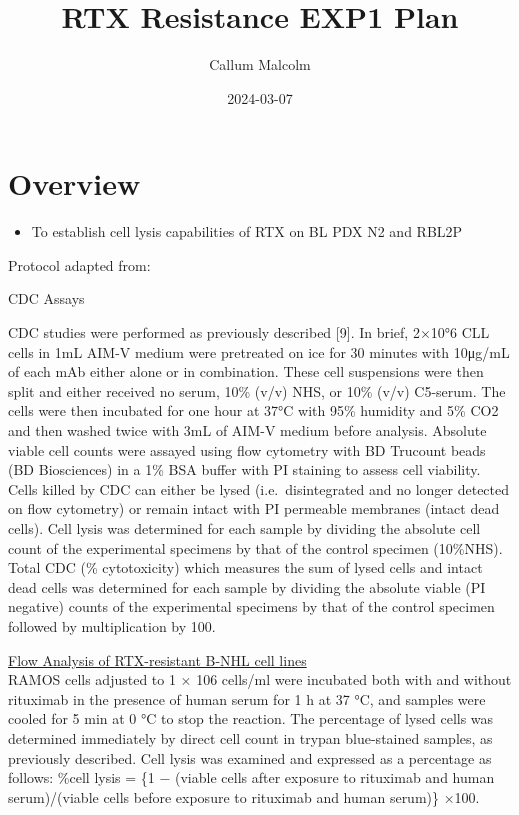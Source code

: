 \documentclass[
]{article}
\title{RTX Resistance EXP1 Plan}
\author{Callum Malcolm}
\date{2024-03-07}
\providecommand{\tightlist}{%
  \setlength{\itemsep}{0pt}\setlength{\parskip}{0pt}}
\begin{document}
\maketitle

\hypertarget{overview}{%
\section{Overview}\label{overview}}

\begin{itemize}
\tightlist
\item
  To establish cell lysis capabilities of RTX on BL PDX N2 and RBL2P
\end{itemize}

Protocol adapted from:

CDC Assays

CDC studies were performed as previously described {[}9{]}. In brief,
2×10°6 CLL cells in 1mL AIM-V medium were pretreated on ice for 30
minutes with 10μg/mL of each mAb either alone or in combination. These
cell suspensions were then split and either received no serum, 10\%
(v/v) NHS, or 10\% (v/v) C5-serum. The cells were then incubated for one
hour at 37°C with 95\% humidity and 5\% CO2 and then washed twice with
3mL of AIM-V medium before analysis. Absolute viable cell counts were
assayed using flow cytometry with BD Trucount beads (BD Biosciences) in
a 1\% BSA buffer with PI staining to assess cell viability. Cells killed
by CDC can either be lysed (i.e.~disintegrated and no longer detected on
flow cytometry) or remain intact with PI permeable membranes (intact
dead cells). Cell lysis was determined for each sample by dividing the
absolute cell count of the experimental specimens by that of the control
specimen (10\%NHS). Total CDC (\% cytotoxicity) which measures the sum
of lysed cells and intact dead cells was determined for each sample by
dividing the absolute viable (PI negative) counts of the experimental
specimens by that of the control specimen followed by multiplication by
100.

\href{https://www.sciencedirect.com/science/article/pii/S0145212605003607?via\%3Dihub}{Flow
Analysis of RTX-resistant B-NHL cell lines}\\
RAMOS cells adjusted to 1 × 106 cells/ml were incubated both with and
without rituximab in the presence of human serum for 1 h at 37 °C, and
samples were cooled for 5 min at 0 °C to stop the reaction. The
percentage of lysed cells was determined immediately by direct cell
count in trypan blue-stained samples, as previously described. Cell
lysis was examined and expressed as a percentage as follows: \%cell
lysis = \{1 − (viable cells after exposure to rituximab and human
serum)/(viable cells before exposure to rituximab and human serum)\}
×100.
\end{document}
